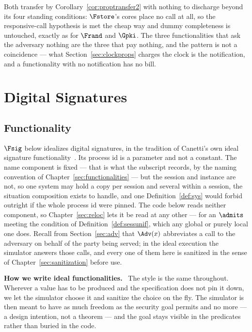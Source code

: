 \documentclass[10pt,oneside,openany]{book}
\newcommand{\heading}[1]{\medskip\par\noindent\textcolor{accent}{\textbf{#1.}}\ }
\theoremstyle{accentdef}
\theoremstyle{accentplain}
\begin{document}
Both transfer by Corollary~\ref{cor:proptransfer2} with nothing to discharge beyond its four
standing conditions: $\Fstore$'s cores place no call at all, so the responsive-call hypothesis is
met the cheap way and dummy completeness is untouched, exactly as for $\Frand$ and $\Gpki$. The
three functionalities that ask the adversary nothing are the three that pay nothing, and the
pattern is not a coincidence --- what Section~\ref{sec:clockprops} charges the clock is the
notification, and a functionality with no notification has no bill.

\chapter{Digital Signatures}\label{sec:fsig}

\section{Functionality}\label{sec:fsigfunc}

$\Fsig$ below idealizes digital signatures, in the tradition of Canetti's own ideal signature
functionality~\cite{Canetti04}. Its process id is a parameter and not a constant. The
name component is fixed --- that is what the subscript records, by the naming convention of
Chapter~\ref{sec:functionalities} --- but the session and instance are not, so one system may hold
a copy per session and several within a session, the situation composition exists to handle, and
one Definition~\ref{def:sys} would forbid outright if the whole process id were pinned. The code
below reads neither component, so Chapter~\ref{sec:reloc} lets it be read at any other --- for an
$\admits$ meeting the condition of Definition~\ref{def:sessunif}, which any global or purely local one
does. Recall
from Section~\ref{sec:adv} that $\Adv(x)$ abbreviates a call to the adversary on behalf of the
party being served; in the ideal execution the simulator answers those calls, and every one of
them here is sanitized in the sense of Chapter~\ref{sec:sanitization} before use.

\heading{How we write ideal functionalities} The style is the same throughout. Wherever a value
has to be produced and the specification does not pin it down, we let the simulator choose it and
sanitize the choice on the fly. The simulator is then meant to have as much freedom as the
security goal permits and no more --- a design intention, not a theorem --- and the goal stays
visible in the predicates rather than buried in the code.
\end{document}
